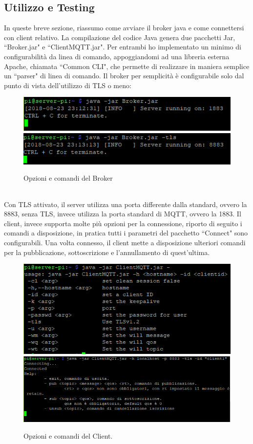 \documentclass{article}
\begin{document}
\newpage
\subsection{Utilizzo e Testing}
In queste breve sezione, riassumo come avviare il broker java e come connettersi con client relativo. La compilazione del codice Java genera due pacchetti Jar, ``Broker.jar" e ``ClientMQTT.jar". Per entrambi ho implementato un minimo di configurabilità da linea di comando, appoggiandomi ad una libreria esterna Apache, chiamata ``Common CLI", che permette di realizzare in maniera semplice un ``parser" di linea di comando. Il broker per semplicità è configurabile solo dal punto di vista dell'utilizzo di TLS o meno:
\begin{figure}[htbp]
	\centerline{
		\includegraphics[scale=0.6]{immagini/broker_no_tls.PNG}
		\includegraphics[scale=0.6]{immagini/broker_tls.PNG}
	}
\caption{Opzioni e comandi del Broker}
\end{figure}\\
Con TLS attivato, il server utilizza una porta differente dalla standard, ovvero la 8883, senza TLS, invece utilizza la porta standard di MQTT, ovvero la 1883. Il client, invece supporta molte più opzioni per la connessione, riporto di seguito i comandi a disposizione, in pratica tutti i parametri del pacchetto ``Connect" sono configurabili. Una volta connesso, il client mette a disposizione ulteriori comandi per la pubblicazione, sottoscrizione e l'annullamento di quest'ultima.
\begin{figure}[htbp]
	\centerline{
		\includegraphics[scale=0.45]{immagini/client_cmd.PNG}
		\includegraphics[scale=0.45]{immagini/client_cmd_connected.PNG}
	}
\caption{Opzioni e comandi del Client.}
\end{figure}\\
\end{document}

